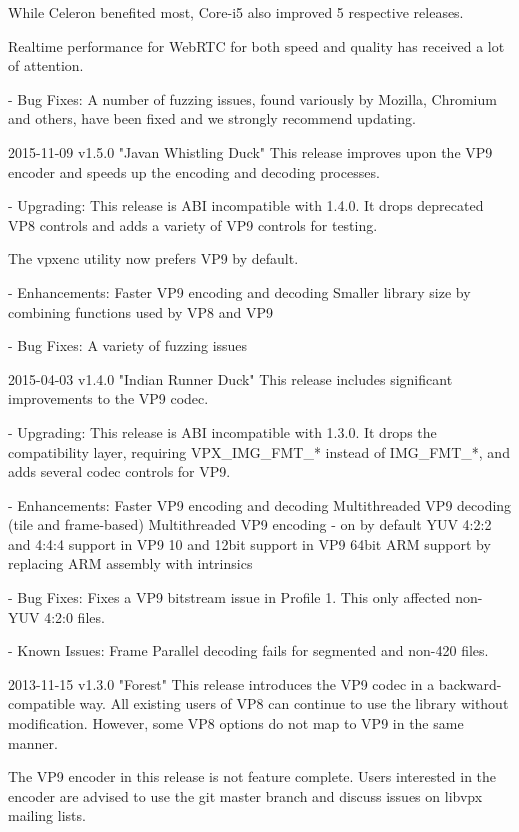 \begin{DoxyVerbInclude}
    While Celeron benefited most, Core-i5 also improved 5%
    respective releases.

    Realtime performance for WebRTC for both speed and quality has received a
    lot of attention.

  - Bug Fixes:
    A number of fuzzing issues, found variously by Mozilla, Chromium and others,
    have been fixed and we strongly recommend updating.

2015-11-09 v1.5.0 "Javan Whistling Duck"
  This release improves upon the VP9 encoder and speeds up the encoding and
  decoding processes.

  - Upgrading:
    This release is ABI incompatible with 1.4.0. It drops deprecated VP8
    controls and adds a variety of VP9 controls for testing.

    The vpxenc utility now prefers VP9 by default.

  - Enhancements:
    Faster VP9 encoding and decoding
    Smaller library size by combining functions used by VP8 and VP9

  - Bug Fixes:
    A variety of fuzzing issues

2015-04-03 v1.4.0 "Indian Runner Duck"
  This release includes significant improvements to the VP9 codec.

  - Upgrading:
    This release is ABI incompatible with 1.3.0. It drops the compatibility
    layer, requiring VPX_IMG_FMT_* instead of IMG_FMT_*, and adds several codec
    controls for VP9.

  - Enhancements:
    Faster VP9 encoding and decoding
    Multithreaded VP9 decoding (tile and frame-based)
    Multithreaded VP9 encoding - on by default
    YUV 4:2:2 and 4:4:4 support in VP9
    10 and 12bit support in VP9
    64bit ARM support by replacing ARM assembly with intrinsics

  - Bug Fixes:
    Fixes a VP9 bitstream issue in Profile 1. This only affected non-YUV 4:2:0
    files.

  - Known Issues:
    Frame Parallel decoding fails for segmented and non-420 files.

2013-11-15 v1.3.0 "Forest"
  This release introduces the VP9 codec in a backward-compatible way.
  All existing users of VP8 can continue to use the library without
  modification. However, some VP8 options do not map to VP9 in the same manner.

  The VP9 encoder in this release is not feature complete. Users interested in
  the encoder are advised to use the git master branch and discuss issues on
  libvpx mailing lists.


\end{DoxyVerbInclude}
